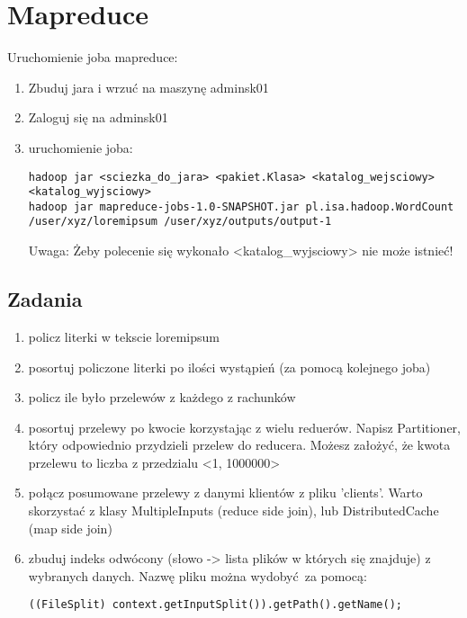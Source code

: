 \documentclass{article}
\begin{document}
\section*{Mapreduce}

Uruchomienie joba mapreduce:
\begin{enumerate}
\item Zbuduj jara i wrzuć na maszynę adminsk01
\item Zaloguj się na adminsk01
\item uruchomienie joba:
\begin{lstlisting}
hadoop jar <sciezka_do_jara> <pakiet.Klasa> <katalog_wejsciowy> <katalog_wyjsciowy>
hadoop jar mapreduce-jobs-1.0-SNAPSHOT.jar pl.isa.hadoop.WordCount /user/xyz/loremipsum /user/xyz/outputs/output-1
\end{lstlisting}

Uwaga: Żeby polecenie się wykonało <katalog\_wyjsciowy> nie może istnieć!
\end{enumerate}

\subsection*{Zadania}

\begin{enumerate}
\item policz literki w tekscie loremipsum
\item posortuj policzone literki po ilości wystąpień (za pomocą kolejnego joba)
\item policz ile było przelewów z każdego z rachunków
\item posortuj przelewy po kwocie korzystając z wielu reduerów. Napisz Partitioner, który odpowiednio przydzieli przelew do reducera. Możesz założyć, że kwota przelewu to liczba z przedzialu <1, 1000000>
\item połącz posumowane przelewy z danymi klientów z pliku 'clients'. Warto skorzystać z klasy MultipleInputs (reduce side join), lub DistributedCache (map side join)
\item zbuduj indeks odwócony (słowo -> lista plików w których się znajduje) z wybranych danych. Nazwę pliku można wydobyć za pomocą:
\begin{lstlisting}
((FileSplit) context.getInputSplit()).getPath().getName();
\end{lstlisting}
\end{enumerate}
\end{document}
